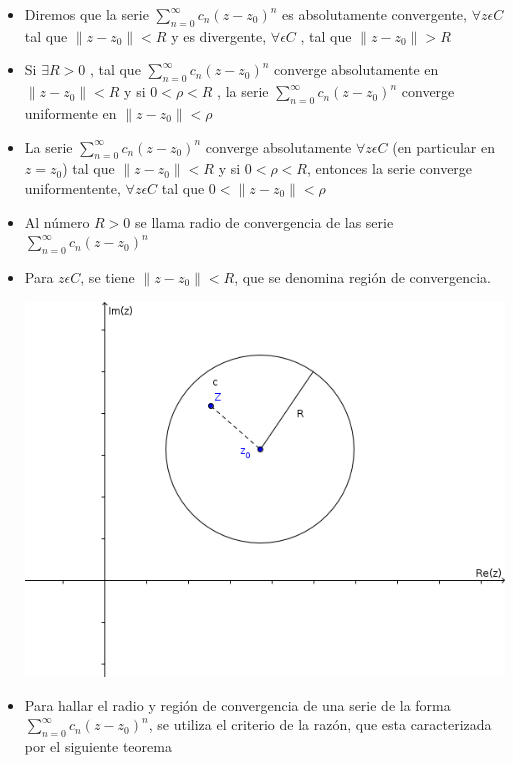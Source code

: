 \documentclass[10pt,a4paper]{article}
\begin{document}
\begin{itemize}
\item Diremos que la serie $\displaystyle{\sum_{n = 0}^{\infty} c_n (z-z_0)^n}$ es absolutamente convergente, $\forall z \epsilon C$ tal que $ \parallel z - z_0 \parallel  < R$ y es divergente, $\forall \epsilon  C$ , tal que $\parallel z - z_0 \parallel > R$
\item Si $\exists R > 0$ , tal que $\displaystyle{\sum_{n = 0}^{\infty} c_n (z-z_0)^n}$ converge absolutamente en $\parallel z - z_0 \parallel < R$ y si $0 < \rho < R$ , la serie $\displaystyle{\sum_{n = 0}^{\infty} c_n (z-z_0)^n}$ converge uniformente en $\parallel z - z_0 \parallel < \rho$
\item La serie $\displaystyle{\sum_{n = 0}^{\infty} c_n (z-z_0)^n}$ converge absolutamente  $\forall z \epsilon C$ (en particular en $z = z_0$) tal que $\parallel z - z_0 \parallel < R $ y si $0 < \rho < R$, entonces la serie converge uniformentente, $\forall z \epsilon C$ tal que $0< \parallel z - z_0 \parallel < \rho$
\item Al número $R > 0$ se llama radio de convergencia de las serie $\displaystyle{\sum_{n = 0}^{\infty} c_n (z-z_0)^n}$
\item Para $z \epsilon C$, se tiene $\parallel z - z_0 \parallel < R$, que se denomina región de convergencia.
\begin{center}
\includegraphics[scale=0.5]{1.png}
\end{center}
\item Para hallar el radio y región de convergencia de una serie de la forma $\displaystyle{\sum_{n = 0}^{\infty} c_n (z-z_0)^n}$, se utiliza el criterio de la razón, que esta caracterizada por el siguiente teorema
\end{itemize}
\end{document}
